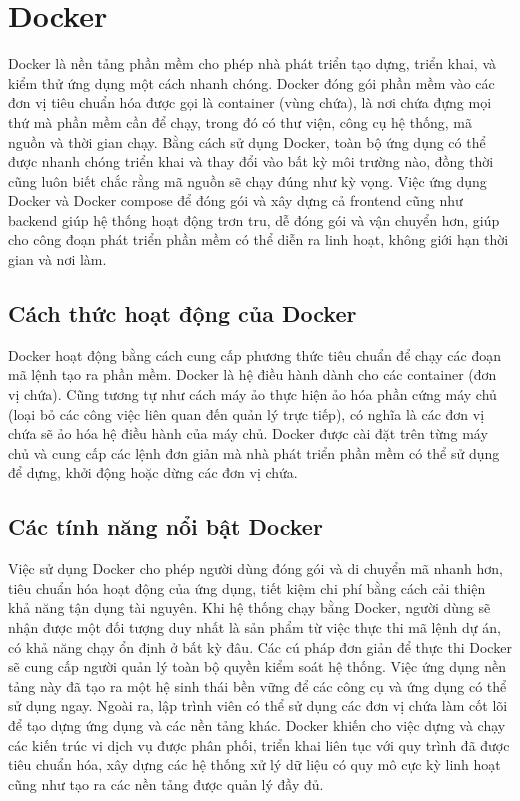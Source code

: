 \documentclass[./../main.tex]{subfiles}
\begin{document}
\section{Docker}
Docker \cite{docker} là nền tảng phần mềm cho phép nhà phát triển tạo dựng, triển khai, và kiểm thử ứng dụng một cách nhanh chóng. Docker đóng gói phần mềm vào các đơn vị tiêu chuẩn hóa được gọi là container (vùng chứa), là nơi chứa đựng mọi thứ mà phần mềm cần để chạy, trong đó có thư viện, công cụ hệ thống, mã nguồn và thời gian chạy. Bằng cách sử dụng Docker, toàn bộ ứng dụng có thể được nhanh chóng triển khai và thay đổi vào bất kỳ môi trường nào, đồng thời cũng luôn biết chắc rằng mã nguồn sẽ chạy đúng như kỳ vọng. Việc ứng dụng Docker và Docker compose để đóng gói và xây dựng cả frontend cũng như backend giúp hệ thống hoạt động trơn tru, dễ đóng gói và vận chuyển hơn, giúp cho công đoạn phát triển phần mềm có thể diễn ra linh hoạt, không giới hạn thời gian và nơi làm.

\subsection{Cách thức hoạt động của Docker}
Docker hoạt động bằng cách cung cấp phương thức tiêu chuẩn để chạy các đoạn mã lệnh tạo ra phần mềm. Docker là hệ điều hành dành cho các container (đơn vị chứa). Cũng tương tự như cách máy ảo thực hiện ảo hóa phần cứng máy chủ (loại bỏ các công việc liên quan đến quản lý trực tiếp), có nghĩa là các đơn vị chứa sẽ ảo hóa hệ điều hành của máy chủ. Docker được cài đặt trên từng máy chủ và cung cấp các lệnh đơn giản mà nhà phát triển phần mềm có thể sử dụng để dựng, khởi động hoặc dừng các đơn vị chứa.

\subsection{Các tính năng nổi bật Docker}
Việc sử dụng Docker cho phép người dùng đóng gói và di chuyển mã nhanh hơn, tiêu chuẩn hóa hoạt động của ứng dụng, tiết kiệm chi phí bằng cách cải thiện khả năng tận dụng tài nguyên. Khi hệ thống chạy bằng Docker, người dùng sẽ nhận được một đối tượng duy nhất là sản phẩm từ việc thực thi mã lệnh dự án, có khả năng chạy ổn định ở bất kỳ đâu. Các cú pháp đơn giản để thực thi Docker sẽ cung cấp người quản lý toàn bộ quyền kiểm soát hệ thống. Việc ứng dụng nền tảng này đã tạo ra một hệ sinh thái bền vững để các công cụ và ứng dụng có thể sử dụng ngay. Ngoài ra, lập trình viên có thể sử dụng các đơn vị chứa làm cốt lõi để tạo dựng ứng dụng và các nền tảng khác. Docker khiến cho việc dựng và chạy các kiến trúc vi dịch vụ được phân phối, triển khai liên tục với quy trình đã được tiêu chuẩn hóa, xây dựng các hệ thống xử lý dữ liệu có quy mô cực kỳ linh hoạt cũng như tạo ra các nền tảng được quản lý đầy đủ. 
\end{document}
